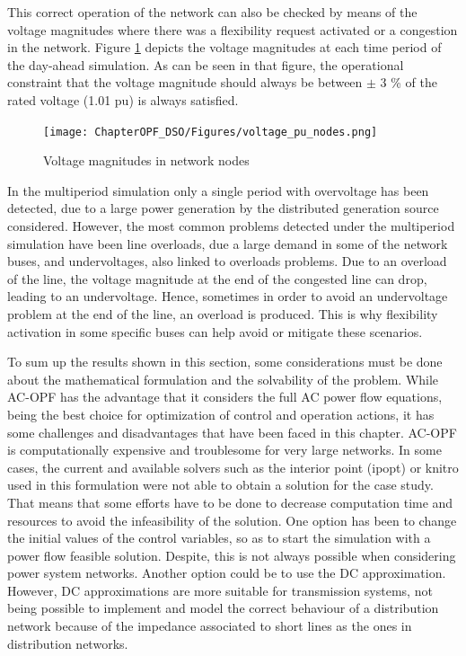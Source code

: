 This correct operation of the network can also be checked by means of the voltage magnitudes where there was a flexibility request activated or a congestion in the network. Figure \ref{fig:voltage_magnitudes} depicts the voltage magnitudes at each time period of the day-ahead simulation. As  can be seen in that figure, the operational constraint that the voltage magnitude should always be between $\pm$ 3 \% of the rated voltage (1.01 pu) is always satisfied.
 
\begin{figure}[H]
	\centering
	\texttt{[image: ChapterOPF\_DSO/Figures/voltage\_pu\_nodes.png]}
	\caption{Voltage magnitudes in network nodes}
	\label{fig:voltage_magnitudes}  
\end{figure}

In the multiperiod simulation only a single period with overvoltage has been detected, due to a large power generation by the distributed generation source considered. However, the most common problems detected under the multiperiod simulation have been line overloads, due a large demand in some of the network buses, and undervoltages, also linked to overloads problems. Due to an overload of the line, the voltage magnitude at the end of the congested line can drop, leading to an undervoltage. Hence, sometimes in order to avoid an undervoltage problem at the end of the line, an overload is produced. This is why flexibility activation in some specific buses can help avoid or mitigate these scenarios. 

To sum up the results shown in this section, some considerations must be done about the mathematical formulation and the solvability of the problem. While AC-OPF has the advantage that it considers the full AC power flow equations, being the best choice for optimization of control and operation actions, it has some challenges and disadvantages that have been faced in this chapter. AC-OPF is computationally expensive and troublesome for very large networks. In some cases, the current and available solvers such as the interior point (ipopt) or knitro used in this formulation were not able to obtain a solution for the case study. That means that some efforts have to be done to decrease computation time and resources to avoid the infeasibility of the solution. One option has been to change the initial values of the control variables, so as to start the simulation with a power flow feasible solution. Despite, this is not always possible when considering power system networks. Another option could be to use the DC approximation. However, DC approximations are more suitable for transmission systems, not being possible to implement and model the correct behaviour of a distribution network because of the impedance associated to short lines as the ones in distribution networks. 

